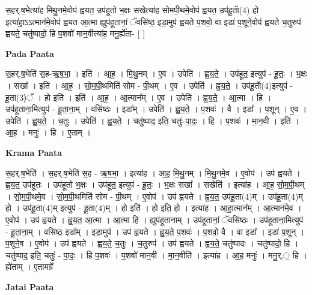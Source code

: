 \documentclass[17pt]{extarticle}
\begin{document}
स॒हर्.ष॒भेत्या॑ह मिथु॒नमे॒वोप॑ ह्वयत॒ उप॑हूतो भ॒क्षः सखेत्या॑ह सोमपी॒थमे॒वोप॑ ह्वयत॒ उप॑हू॒ताॅ(4) हो इत्या॑हा॒ऽऽत्मान॑मे॒वोप॑ ह्वयत आ॒त्मा ह्युप॑हूतानां॒ ॅवसि॑ष्ठ॒ इडा॒मुप॑ ह्वयते प॒शवो॒ वा इडा॑ प॒शूने॒वोप॑ ह्वयते च॒तुरुप॑ ह्वयते॒ चतु॑ष्पादो॒ हि प॒शवो॑ मान॒वीत्या॑ह॒ मनु॒र्ह्ये॑ता- [  ] \newline

\textbf{Pada Paata} \newline

स॒हर्.ष॒भेति॑ स॒ह-ऋ॒ष॒भा॒ । इति॑ । आ॒ह॒ । मि॒थु॒नम् । ए॒व । उपेति॑ । ह्व॒य॒ते॒ । उप॑हूत॒ इत्युप॑ - हू॒तः॒ । भ॒क्षः । सखा᳚ । इति॑ । आ॒ह॒ । सो॒म॒पी॒थमिति॑ सोम - पी॒थम् । ए॒व । उपेति॑ । ह्व॒य॒ते॒ । उप॑हू॒ताॅ(4)इत्युप॑ - हू॒ता(3)ॅ । हो इति॑ । इति॑ । आ॒ह॒ । आ॒त्मान᳚म् । ए॒व । उपेति॑ । ह्व॒य॒ते॒ । आ॒त्मा । हि । उप॑हूताना॒मित्युप॑ - हू॒ता॒ना॒म् । वसि॑ष्ठः । इडा᳚म् । उपेति॑ । ह्व॒य॒ते॒ । प॒शवः॑ । वै । इडा᳚ । प॒शून् । ए॒व । उपेति॑ । ह्व॒य॒ते॒ । च॒तुः । उपेति॑ । ह्व॒य॒ते॒ । चतु॑ष्पाद॒ इति॒ चतुः॑-पा॒दः॒ । हि । प॒शवः॑ । मा॒न॒वी । इति॑ । आ॒ह॒ । मनुः॑ । हि । ए॒ताम् ।  \newline


\textbf{Krama Paata} \newline

स॒हर्.ष॒भेति॑ । स॒हर्.ष॒भेति॑ स॒ह - ऋ॒ष॒भा॒ । इत्या॑ह । आ॒ह॒ मि॒थु॒नम् । मि॒थु॒नमे॒व । ए॒वोप॑ । उप॑ ह्वयते । ह्व॒य॒त॒ उप॑हूतः । उप॑हूतो भ॒क्षः । उप॑हूत॒ इत्युप॑ - हू॒तः॒ । भ॒क्षः सखा᳚ । सखेति॑ । इत्या॑ह । आ॒ह॒ सो॒म॒पी॒थम् । सो॒म॒पी॒थमे॒व । सो॒म॒पी॒थमिति॑ सोम - पी॒थम् । ए॒वोप॑ । उप॑ ह्वयते । ह्व॒य॒त॒ उप॑हू॒ता(4)म् । उप॑हू॒ता(4)म् हो । उप॑हू॒ता(4)म् इत्युप॑ - हू॒ता(4)म् । हो इति॑ । हो इति॒ हो । इत्या॑ह । आ॒हा॒त्मान᳚म् । आ॒त्मान॑मे॒व । ए॒वोप॑ । उप॑ ह्वयते । ह्व॒य॒त॒ आ॒त्मा । आ॒त्मा हि । ह्युप॑हूतानाम् । उप॑हूतानां॒ ॅवसि॑ष्ठः । उप॑हूताना॒मित्युप॑ - हू॒ता॒ना॒म् । वसि॑ष्ठ॒ इडा᳚म् । इडा॒मुप॑ । उप॑ ह्वयते । ह्व॒य॒ते॒ प॒शवः॑ । प॒शवो॒ वै । वा इडा᳚ । इडा॑ प॒शून् । प॒शूने॒व । ए॒वोप॑ । उप॑ ह्वयते । ह्व॒य॒ते॒ च॒तुः । च॒तुरुप॑ । उप॑ ह्वयते । ह्व॒य॒ते॒ चतु॑ष्पादः । चतु॑ष्पादो॒ हि । चतु॑ष्पाद॒ इति॒ चतुः॑ - पा॒दः॒ । हि प॒शवः॑ । प॒शवो॑ मान॒वी । मा॒न॒वीति॑ । इत्या॑ह । आ॒ह॒ मनुः॑ । मनु॒र्.॒ हि । ह्ये॑ताम् । ए॒तामग्रे᳚ \newline

\textbf{Jatai Paata} \newline
\end{document}
